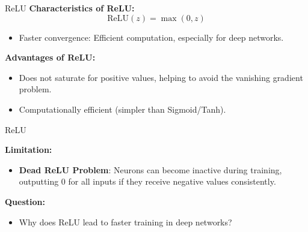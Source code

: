 \documentclass[serif, aspectratio=169]{beamer}
\begin{document}
\begin{frame}{ReLU}
    \textbf{Characteristics of ReLU:}
     \begin{equation*}
      \text{ReLU}(z) = \max(0, z) 
       \end{equation*}
       \begin{itemize}
           \item Faster convergence: Efficient computation, especially for deep networks.
       \end{itemize}
    \textbf{Advantages of ReLU:}
    \begin{itemize}
        \item Does not saturate for positive values, helping to avoid the vanishing gradient problem.
        \item Computationally efficient (simpler than Sigmoid/Tanh).
    \end{itemize}

    \begin{center}
    \end{center}
\end{frame}
\begin{frame}{ReLU}

    \textbf{Limitation:}
    \begin{itemize}
        \item \textbf{Dead ReLU Problem}: Neurons can become inactive during training, outputting 0 for all inputs if they receive negative values consistently.
    \end{itemize}

    \textbf{Question:}
    \begin{itemize}
        \item Why does ReLU lead to faster training in deep networks?
    \end{itemize}

\end{frame}
\end{document}
